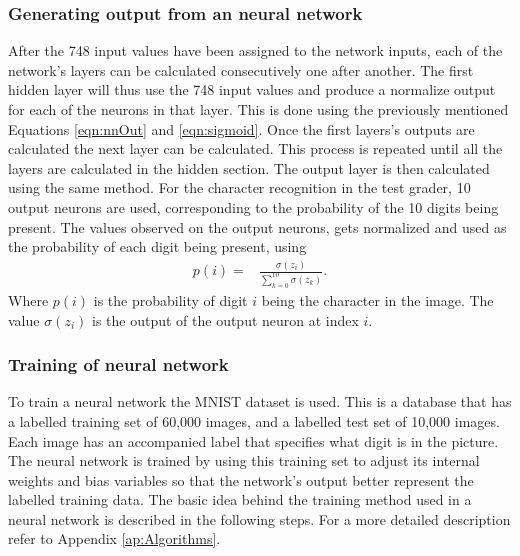 \subsubsection{Generating output from an neural network}
After the 748 input values have been assigned to the network inputs, each of the network's layers can be calculated consecutively one after another. The first hidden layer will thus use the 748 input values and produce a normalize output for each of the neurons in that layer. This is done using the previously mentioned Equations \ref{eqn:nnOut} and \ref{eqn:sigmoid}. Once the first layers's outputs are calculated the next layer can be calculated. This process is repeated until all the layers are calculated in the hidden section. The output layer is then calculated using the same method. For the character recognition in the test grader, 10 output neurons are used, corresponding to the probability of the 10 digits being present. The values observed on the output neurons, gets normalized and used as the probability of each digit being present, using
\begin{align}
  p(i) =  &\displaystyle{\frac{\sigma(z_{i})}{\sum_{k=0}^{10} \sigma(z_{k})}}.
\label{eqn:normal}
\end{align}
Where $p(i)$ is the probability of digit $i$ being the character in the image. The value $\sigma(z_{i})$ is the output of the output neuron at index $i$.
\subsubsection{Training of neural network}
\label{sec:trainNN}
To train a neural network the MNIST dataset is used. This is a database that has a labelled training set of 60,000 images, and a labelled test set of 10,000 images. Each image has an accompanied label that specifies what digit is in the picture. The neural network is trained by using this training set to adjust its internal weights and bias variables so that the network's output better represent the labelled training data. The basic idea behind the training method used in a neural network is described in the following steps. For a more detailed description refer to Appendix \ref{ap:Algorithms}.

